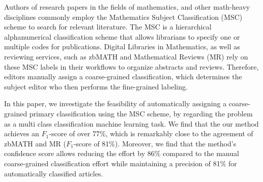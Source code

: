 Authors of research papers in the fields of mathematics, and other math-heavy disciplines commonly employ the Mathematics Subject Classification (MSC) scheme to search for relevant literature.
The MSC is a hierarchical alphanumerical classification scheme that allows librarians to specify one or multiple codes for publications.
Digital Libraries in Mathematics, as well as reviewing services, such as zbMATH and Mathematical Reviews (MR) rely on these MSC labels in their workflows to organize abstracts and reviews.
Therefore, editors manually assign a coarse-grained classification, which determines the subject editor who then performs the fine-grained labeling.

In this paper, we investigate the feasibility of automatically assigning a coarse-grained primary classification using the MSC scheme, by regarding the problem as a multi class classification machine learning task.
We find that the our method achieves an \(F_{1}\)-score of over 77\%, which is remarkably close to the agreement of zbMATH and MR (\(F_{1}\)-score of 81\%).
Moreover, we find that the method's confidence score allows reducing the effort by 86\% compared to the manual coarse-grained classification effort while maintaining a precision of 81\% for automatically classified articles.
